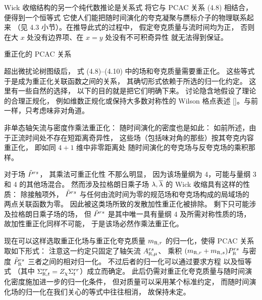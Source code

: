 Wick 收缩结构的另一个纯代数推论是关系式
将它与 PCAC 关系 (4.8) 相结合，
便得到一个恒等式
它使人们能把随时间演化的夸克凝聚与赝标介子的物理联系起来
（见 4.3 小节）。在推导此式的过程中，
假定夸克质量与流时间均为正，
否则在大 $x$ 处没有边界项、在 $x=y$ 处没有不可积奇异性
就无法得到保证。


 重正化的 PCAC 关系

超出微扰论树图级后，
式 (4.8)--(4.10) 中的场和夸克质量需要重正化。
这些等式于是成为重正化关联函数之间的关系，
其确切形式依赖于所选的归一化约定。
这里有一些自然的选择，
以下的目的就是把它们明确下来。
讨论隐含地假设了理论的合理正规化，
例如维数正规化或保持大多数对称性的 Wilson 格点表述
[\cite{Wilson}]。与前一样，只考虑味非对角道。

非单态轴矢流与密度作乘法重正化：
随时间演化的密度也是如此：
如前所述，由于正流时间处不存在短距离奇异性，
这些场（包括味对角的那些）按其夸克内容重正化，
即如同 $4+1$ 维中非零距离处
随时间演化的夸克场与反夸克场的乘积那样。

对于场 $\tilde{P}^{rs}$，
其乘法可重正化性
不那么明显，
因为该场量纲为 4，可能与量纲 3 和 4 的其他场混合。
然而涉及拉格朗日乘子场 $\lambda,\overline{\lambda}$
的 Wick 收缩具有这样的性质：
除接触项外，
$\tilde{P}^{rs}$ 与任何由流时间为零的规范场和夸克场构成的局域场的
两点关联函数为零。
因此被这类场所致的发散加性重正化被排除。
剩下只可能涉及拉格朗日乘子场的场，
但 $\tilde{P}^{rs}$ 是其中唯一具有量纲 4 及所需对称性质的场，
故加性重正化同样不可能，
于是该场必然作乘法重正化。

现在可以这样选取重正化场与重正化夸克质量 $\mR{r}$
的归一化，使得 PCAC 关系取如下形式：
注意这一约定只固定了轴矢流 $\rens{\Aax}{\mu}^{rs}$、
乘积 $(\mR{r}+\mR{s})\ren{\Pax}^{rs}$
与密度 $\ren{\Ptax}^{rs}$ 三者之间的相对归一化。
不过后者的归一化可以通过要求方程
以及恒等式
（其中 $\rens{\Sigma}{t}^{rr}=Z_{\chi}\Sigma_t^{rr}$）成立而确定。
此后仍需对重正化夸克质量与随时间演化密度施加进一步的归一化条件，
但对质量可以采用某个标准约定，
而随时间演化场的归一化在我们关心的等式中往往相消，
故保持未定。

